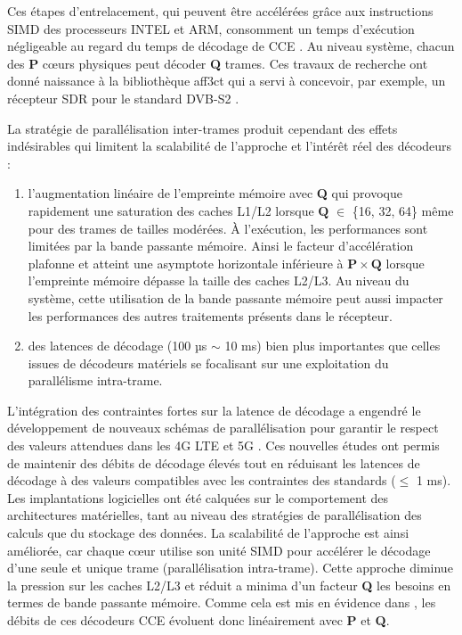 \documentclass[../main.tex]{subfiles}
\begin{document}
Ces étapes d’entrelacement, qui peuvent être accélérées grâce aux instructions SIMD des processeurs INTEL et ARM, consomment un temps d’exécution négligeable au regard du temps de décodage de CCE \cite{ri:LeG15a}. Au niveau système, chacun des \textbf{P} cœurs physiques peut décoder \textbf{Q} trames. Ces travaux de recherche ont donné naissance à la bibliothèque aff3ct \cite{aff3ct} qui a servi à concevoir, par exemple, un récepteur SDR pour le standard DVB-S2 \cite{Cass21}.


La stratégie de parallélisation inter-trames produit cependant des effets indésirables qui limitent la scalabilité de l’approche et l’intérêt réel des décodeurs :
\begin{enumerate}
    \item l’augmentation linéaire de l’empreinte mémoire avec \textbf{Q} qui provoque rapidement une saturation des caches L1/L2 lorsque $\bm{Q}$ $\in$ \{16, 32, 64\} même pour des trames de tailles modérées. À l’exécution, les performances sont limitées par la bande passante mémoire. Ainsi le facteur d’accélération plafonne et atteint une asymptote horizontale inférieure à $\bm{P} \times \bm{Q}$ lorsque l’empreinte mémoire dépasse la taille des caches L2/L3. Au niveau du système, cette utilisation de la bande passante mémoire peut aussi impacter les performances des autres traitements présents dans le récepteur.
    \item des latences de décodage (100 µs $\sim$ 10 ms) bien plus importantes que celles issues de décodeurs matériels se focalisant sur une exploitation du parallélisme intra-trame.
\end{enumerate}


L’intégration des contraintes fortes sur la latence de décodage a engendré le développement de nouveaux schémas de parallélisation \cite{BLG:SIPS:LDPC,BLG:LDPC:NB,Leonardon:2019vf,Adrien,mcgill} pour garantir le respect des valeurs attendues dans les 4G LTE \cite{Ref_4G} et 5G \cite{5g}. Ces nouvelles études ont permis de maintenir des débits de décodage élevés tout en réduisant les latences de décodage à des valeurs compatibles avec les contraintes des standards ($\leq $ 1 ms). Les implantations logicielles ont été calquées sur le comportement des architectures matérielles, tant au niveau des stratégies de parallélisation des calculs que du stockage des données. La scalabilité de l'approche est ainsi améliorée, car chaque cœur utilise son unité SIMD pour accélérer le décodage d'une seule et unique trame (parallélisation intra-trame). Cette approche diminue la pression sur les caches L2/L3 et réduit a minima d'un facteur \textbf{Q} les besoins en termes de bande passante mémoire. Comme cela est mis en évidence dans \cite{Adrien}, les débits de ces décodeurs CCE évoluent donc linéairement avec \textbf{P} et \textbf{Q}.
\end{document}
